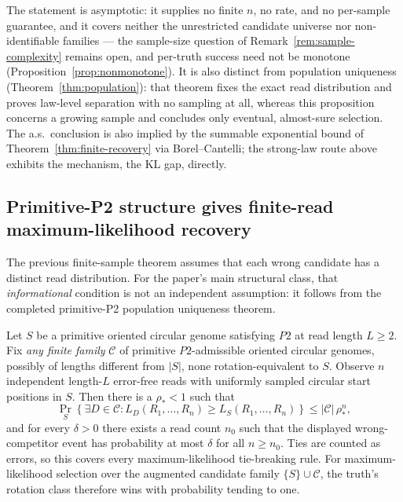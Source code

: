 \begin{remark}
\label{rem:limit-scope}
The statement is asymptotic: it supplies no finite $n$, no rate, and no
per-sample guarantee, and it covers neither the unrestricted candidate
universe nor non-identifiable families --- the sample-size question of
Remark~\ref{rem:sample-complexity} remains open, and per-truth success need
not be monotone (Proposition~\ref{prop:nonmonotone}). It is also distinct
from population uniqueness (Theorem~\ref{thm:population}): that theorem
fixes the exact read distribution and proves law-level separation with no
sampling at all, whereas this proposition concerns a growing sample and
concludes only eventual, almost-sure selection. The a.s.\ conclusion is
also implied by the summable exponential bound of
Theorem~\ref{thm:finite-recovery} via Borel--Cantelli; the strong-law route
above exhibits the mechanism, the KL gap, directly.
\end{remark}


\subsection{Primitive-P2 structure gives finite-read maximum-likelihood recovery}
\label{sec:p2-finite-recovery}

The previous finite-sample theorem assumes that each wrong candidate has a
distinct read distribution.  For the paper's main structural class, that
\emph{informational} condition is not an independent assumption: it follows
from the completed primitive-P2 population uniqueness theorem.

\begin{corollary}
\label{cor:p2-finite-recovery}
Let $S$ be a primitive oriented circular genome satisfying $P2$ at read
length $L\ge 2$.  Fix \emph{any finite family} $\mathcal C$ of primitive
$P2$-admissible oriented circular genomes, possibly of lengths different
from $|S|$, none rotation-equivalent to $S$.  Observe $n$ independent
length-$L$ error-free reads with uniformly sampled circular start
positions in $S$.  Then there is a $\rho_*<1$ such that
\[
 \Pr_S\!\left\{
   \exists D\in\mathcal C:
       L_D(R_1,\dots,R_n)\ge L_S(R_1,\dots,R_n)
 \right\}
 \le |\mathcal C|\,\rho_*^{n},
\]
and for every $\delta>0$ there exists a read count $n_0$ such that the displayed
wrong-competitor event has probability at most $\delta$ for all $n\ge n_0$.
Ties are counted as errors, so this covers every maximum-likelihood
tie-breaking rule.  For maximum-likelihood selection over the augmented
candidate family $\{S\}\cup\mathcal C$, the truth's rotation class therefore
wins with probability tending to one.
\end{corollary}

